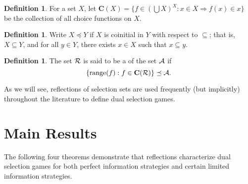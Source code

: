 \documentclass{amsart}
\theoremstyle{plain}
\newtheorem{proposition}[theorem]{Proposition}
\theoremstyle{definition}
\newtheorem{definition}[theorem]{Definition}
\theoremstyle{remark}
\theoremstyle{plain}
\theoremstyle{definition}
\theoremstyle{remark}
\begin{document}
\begin{definition}
  For a set \(X\), let \(\mathbf C(X)=\{f\in(\bigcup X)^X:x\in X\Rightarrow f(x)\in x\}\)
  be the collection of all choice functions on \(X\).
\end{definition}

\begin{definition}
  Write \(X\preceq Y\) if \(X\) is coinitial in \(Y\) with respect to \(\subseteq\);
  that is, \(X\subseteq Y\), and for all \(y\in Y\), there exists \(x\in X\) such that 
  \(x\subseteq y\).
\end{definition}

\begin{definition}
  The set \(\mathcal{R}\) is said to be a  of the set \(\mathcal{A}\)
  if \[\{\text{range}(f):f\in\mathbf C(\mathcal{R})\}\preceq\mathcal{A}.\]
\end{definition}

As we will see, reflections of selection sets are used frequently (but implicitly) 
throughout the literature to define dual selection games.


\section{Main Results}

%

The following four theorems demonstrate that reflections characterize
dual selection games for both perfect information strategies and
certain limited information strategies.
\end{document}
